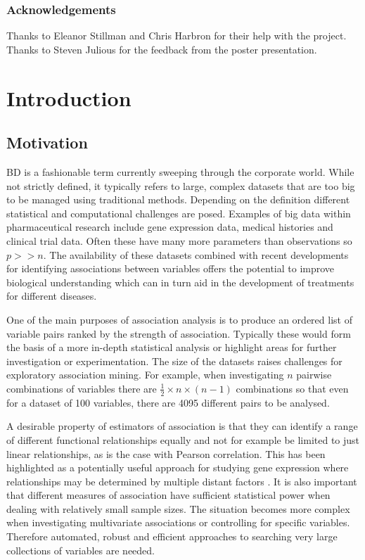 \documentclass[a4paper, 12pt]{report}
\begin{document}
\newpage
\subsection*{Acknowledgements}
Thanks to Eleanor Stillman and Chris Harbron for their help with the project. Thanks to Steven Julious for the feedback from the poster presentation.  %

\tableofcontents{}
 
\chapter{Introduction}

\section{Motivation}
\gls{BD} is a fashionable term currently sweeping through the corporate world. While not strictly defined, it typically refers to large, complex datasets that are too big to be managed using traditional methods. Depending on the definition different statistical and computational challenges are posed. Examples of big data within pharmaceutical research include gene expression data, medical histories and clinical trial data. Often these have many more parameters than observations so $p >> n$. The availability of these datasets combined with recent developments for identifying associations between variables offers the potential to improve biological understanding which can in turn aid in the development of treatments for different diseases. 

One of the main purposes of association analysis is to produce an ordered list of variable pairs ranked by the strength of association. Typically these would form the basis of a more in-depth statistical analysis or highlight areas for further investigation or experimentation. The size of the datasets raises challenges for exploratory association mining. For example, when investigating $n$ pairwise combinations of variables there are $\frac{1}{2} \times n \times (n-1)$ combinations so that even for a dataset of 100 variables, there are 4095 different pairs to be analysed. 

A desirable property of estimators of association is that they can identify a range of different functional relationships equally and not for example be limited to just linear relationships, as is the case with Pearson correlation. 
This has been highlighted as a potentially useful approach for studying gene expression where relationships may be determined by multiple distant factors  \cite{bigdata2012}. It is also important that different measures of association have sufficient statistical power when dealing with relatively small sample sizes. The situation becomes more complex when investigating multivariate associations or controlling for specific variables. Therefore automated, robust and efficient approaches to searching very large collections of variables are needed.
\end{document}
